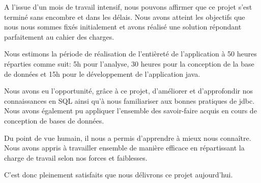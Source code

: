 \documentclass[11pt,a4paper]{report}
\begin{document}
A l’issue d’un mois de travail intensif, nous pouvons affirmer que ce projet s’est terminé sans encombre et dans les délais.
Nous avons atteint les objectifs que nous nous sommes fixés initialement et avons réalisé une solution répondant parfaitement au cahier des charges.
\par

Nous estimons la période de réalisation de l’entièreté de l’application à 50 heures réparties comme suit:
5h pour l’analyse, 30 heures pour la conception de la base de données et 15h pour le développement de l’application java.
\par

Nous avons eu l’opportunité, grâce à ce projet, d’améliorer et d’approfondir nos connaissances en SQL ainsi qu’à nous familiariser aux bonnes pratiques de jdbc.
Nous avons également pu appliquer l’ensemble des savoir-faire acquis en cours de conception de bases de données.
\par

Du point de vue humain, il nous a permis d’apprendre à mieux nous connaître.
Nous avons appris à travailler ensemble de manière efficace en répartissant la charge de travail selon nos forces et faiblesses.
\par

C’est donc pleinement satisfaits que nous délivrons ce projet aujourd’hui.
\end{document}
